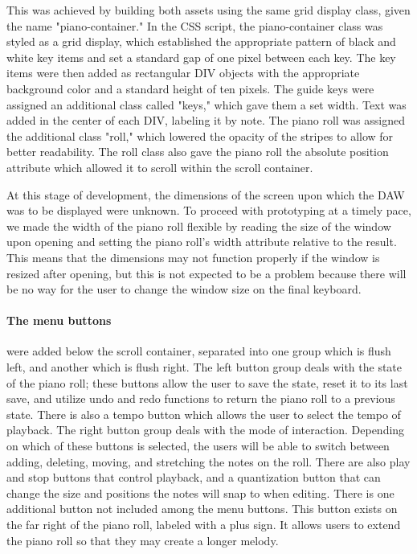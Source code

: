 This was achieved by building both assets using the same grid display class, given the name
"piano-container." In the CSS script, the piano-container class was styled as a grid display,
which established the appropriate pattern of black and white key items and set a standard gap of
one pixel between each key. The key items were then added as rectangular DIV objects with the
appropriate background color and a standard height of ten pixels. The guide keys were assigned an
additional class called "keys," which gave them a set width. Text was added in the center of each
DIV, labeling it by note. The piano roll was assigned the additional class "roll," which lowered
the opacity of the stripes to allow for better readability. The roll class also gave the piano roll
the absolute position attribute which allowed it to scroll within the scroll container.

At this stage of development, the dimensions of the screen upon which the DAW was to be displayed
were unknown. To proceed with prototyping at a timely pace, we made the width of the piano roll
flexible by reading the size of the window upon opening and setting the piano roll's width
attribute relative to the result. This means that the dimensions may not function properly if the
window is resized after opening, but this is not expected to be a problem because there will be
no way for the user to change the window size on the final keyboard.

\paragraph{The menu buttons} were added below the scroll container, separated into one group which is flush
left, and another which is flush right. The left button group deals with the state of the piano
roll; these buttons allow the user to save the state, reset it to its last save, and utilize undo and
redo functions to return the piano roll to a previous state. There is also a tempo button which
allows the user to select the tempo of playback. The right button group deals with the mode of
interaction. Depending on which of these buttons is selected, the users will be able to switch
between adding, deleting, moving, and stretching the notes on the roll. There are also play and
stop buttons that control playback, and a quantization button that can change the size and
positions the notes will snap to when editing. There is one additional button not included among
the menu buttons. This button exists on the far right of the piano roll, labeled with a plus sign.
It allows users to extend the piano roll so that they may create a longer melody.

